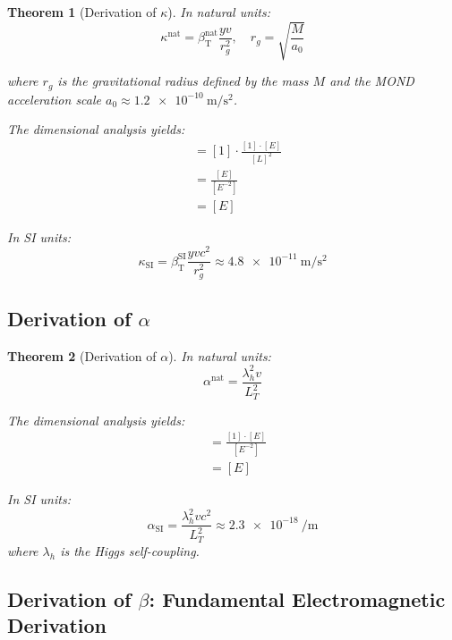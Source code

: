 \documentclass[12pt,a4paper]{article}
\newcommand{\betaT}{\beta_{\text{T}}}
\newtheorem{theorem}{Theorem}[section]
\begin{document}
	\begin{theorem}[Derivation of \(\kappa\)]
		In natural units:
		\begin{equation}
			\kappa^{\text{nat}} = \betaT^{\text{nat}} \frac{y v}{r_g^2}, \quad r_g = \sqrt{\frac{M}{a_0}}
		\end{equation}
		
		where \(r_g\) is the gravitational radius defined by the mass \(M\) and the MOND acceleration scale \(a_0 \approx \SI{1.2e-10}{\meter\per\second\squared}\).
		
		The dimensional analysis yields:
		\begin{align}
			[\kappa^{\text{nat}}] &= [1] \cdot \frac{[1] \cdot [E]}{[L]^2} \\
			&= \frac{[E]}{[E^{-2}]} \\
			&= [E]
		\end{align}
		
		In SI units:
		\begin{equation}
			\kappa_{\text{SI}} = \betaT^{\text{SI}} \frac{y v c^2}{r_g^2} \approx \SI{4.8e-11}{\meter\per\second\squared}
		\end{equation}
	\end{theorem}
	
	\subsection{Derivation of \(\alpha\)}
	
	\begin{theorem}[Derivation of \(\alpha\)]
		In natural units:
		\begin{equation}
			\alpha^{\text{nat}} = \frac{\lambda_h^2 v}{L_T^2}
		\end{equation}
		
		The dimensional analysis yields:
		\begin{align}
			[\alpha^{\text{nat}}] &= \frac{[1] \cdot [E]}{[E^{-2}]} \\
			&= [E]
		\end{align}
		
		In SI units:
		\begin{equation}
			\alpha_{\text{SI}} = \frac{\lambda_h^2 v c^2}{L_T^2} \approx \SI{2.3e-18}{\per\meter}
		\end{equation}
		where \(\lambda_h\) is the Higgs self-coupling.
	\end{theorem}
	
	\subsection{Derivation of \(\beta\): Fundamental Electromagnetic Derivation}
	
\end{document}
